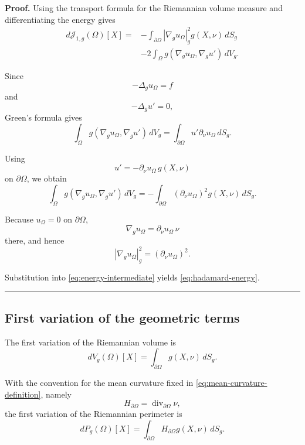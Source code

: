 \documentclass{article}
\renewcommand{\boxed}[1]{#1}
\newenvironment{proof}[1][Proof]{\textbf{#1.} }{\ \rule{0.5em}{0.5em}}
\begin{document}
\begin{proof}
Using the transport formula for the Riemannian volume measure and
differentiating the energy gives
\begin{equation}
\begin{aligned}
d\mathcal J_{1,g}(\Omega)[X]
={}&
-\int_{\partial\Omega}
|\nabla_g u_\Omega|_g^2
g(X,\nu)\,dS_g
\\
&-2
\int_\Omega
g(\nabla_g u_\Omega,\nabla_g u')\,dV_g.
\end{aligned}
\label{eq:energy-intermediate}
\end{equation}

Since
\[
-\Delta_g u_\Omega=f
\]
and
\[
-\Delta_g u'=0,
\]
Green's formula gives
\begin{equation}
\int_\Omega
g(\nabla_g u_\Omega,\nabla_g u')\,dV_g
=
\int_{\partial\Omega}
u'\partial_\nu u_\Omega\,dS_g.
\end{equation}

Using
\[
u'
=
-\partial_\nu u_\Omega\,g(X,\nu)
\]
on $\partial\Omega$, we obtain
\begin{equation}
\int_\Omega
g(\nabla_g u_\Omega,\nabla_g u')\,dV_g
=
-\int_{\partial\Omega}
(\partial_\nu u_\Omega)^2
g(X,\nu)\,dS_g.
\end{equation}

Because $u_\Omega=0$ on $\partial\Omega$,
\[
\nabla_g u_\Omega
=
\partial_\nu u_\Omega\,\nu
\]
there, and hence
\[
|\nabla_g u_\Omega|_g^2
=
(\partial_\nu u_\Omega)^2.
\]

Substitution into
\eqref{eq:energy-intermediate} yields
\eqref{eq:hadamard-energy}.
\end{proof}


\subsection{First variation of the geometric terms}
\label{subsec:geometric-variations}

The first variation of the Riemannian volume is
\begin{equation}
\boxed{
dV_g(\Omega)[X]
=
\int_{\partial\Omega}
g(X,\nu)\,dS_g.
}
\label{eq:first-variation-volume}
\end{equation}

With the convention for the mean curvature fixed in
\eqref{eq:mean-curvature-definition}, namely
\[
H_{\partial\Omega}
=
\operatorname{div}_{\partial\Omega}\nu,
\]
the first variation of the Riemannian perimeter is
\begin{equation}
\boxed{
dP_g(\Omega)[X]
=
\int_{\partial\Omega}
H_{\partial\Omega}
g(X,\nu)\,dS_g.
}
\label{eq:first-variation-perimeter-proof}
\end{equation}
\end{document}
